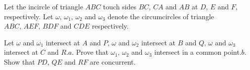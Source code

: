 Let the incircle of triangle $ ABC$ touch sides $ BC,\, CA$ and $ AB$ at $ D,\, E$ and $ F,$ respectively. Let $ \omega,\,\omega_{1},\,\omega_{2}$ and $ \omega_{3}$ denote the circumcircles of triangle $ ABC,\, AEF,\, BDF$ and $ CDE$ respectively.

Let $ \omega$ and $ \omega_{1}$ intersect at $ A$ and $ P,\,\omega$ and $ \omega_{2}$ intersect at $ B$ and $ Q,\,\omega$ and $ \omega_{3}$ intersect at $ C$ and $ R.$$ a.$ Prove that $ \omega_{1},\,\omega_{2}$ and $ \omega_{3}$ intersect in a common point.$ b.$ Show that $ PD,\, QE$ and $ RF$ are concurrent.